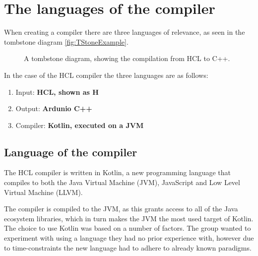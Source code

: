 \section{The languages of the compiler}
\label{langsOfCompiler}
When creating a compiler there are three languages of relevance, as seen in the tombstone diagram \ref{fig:TStoneExample}.

\begin{figure}[H]
	\centering
	\caption{
		A tombstone diagram, showing the compilation from HCL to C++\cite{TStoneWiki}.
	}
	\label{fig:TStoneOnlyHCL}
\end{figure}
In the case of the HCL compiler the three languages are as follows:

\begin{enumerate}
\item Input: \textbf{HCL, shown as H} \\
\item Output: \textbf{Ardunio C++} \\
\item Compiler: \textbf{Kotlin, executed on a JVM} \\
\end{enumerate}

\subsection{Language of the compiler}
The HCL compiler is written in Kotlin\cite{KotlinWebsite}, a new programming language that compiles to both the Java Virtual Machine (JVM), JavaScript and Low Level Virtual Machine (LLVM).

The compiler is compiled to the JVM, as this grants access to all of the Java ecosystem libraries, which in turn makes the JVM the most used target of Kotlin.
The choice to use Kotlin was based on a number of factors.
The group wanted to experiment with using a language they had no prior experience with, however due to time-constraints the new language had to adhere to already known paradigms.

